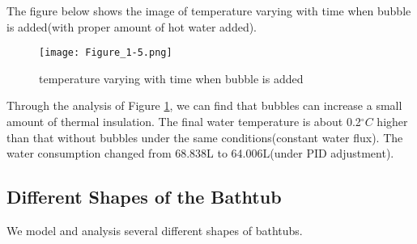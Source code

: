 \documentclass{mcmthesis}
\begin{document}
\indent The figure below shows the image of temperature varying with time when bubble is added(with proper amount of hot water added).
\begin{figure}[H]
	\centerline{\texttt{[image: Figure\_1-5.png]}}
	\caption{temperature varying with time when bubble is added}
	\label{bubble}
\end{figure}
Through the analysis of Figure \ref{bubble}, we can find that bubbles can increase a small amount of thermal insulation. The final water temperature is about 0.2${^\circ}C$ higher than that without bubbles under the same conditions(constant water flux). The water consumption changed from 68.838L to 64.006L(under PID adjustment).

\subsection{Different Shapes of the Bathtub}
We model and analysis several different shapes of bathtubs.
\end{document}
